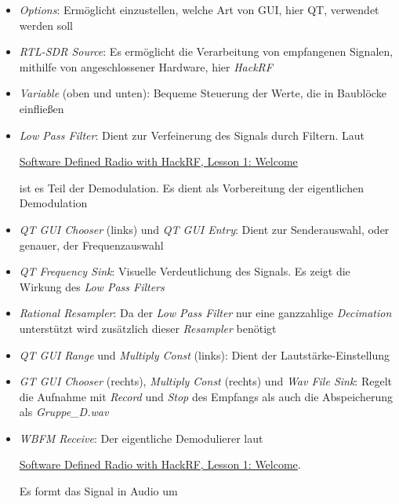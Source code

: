 \documentclass[12pt,a4paper]{article}
\begin{document}
\begin{itemize}
	\item \textit{Options}: Ermöglicht einzustellen, welche Art von 
	GUI, hier QT, verwendet werden soll
	\item \textit{RTL-SDR Source}: Es ermöglicht die Verarbeitung 
	von empfangenen Signalen, mithilfe von angeschlossener Hardware,
	hier \textit{HackRF}
	\item \textit{Variable} (oben und unten): Bequeme Steuerung der 
	Werte, die in Baublöcke einfließen 
	\item \textit{Low Pass Filter}: Dient zur Verfeinerung des 
	Signals durch Filtern. Laut 
	
	\href{https://youtu.be/TZmHgIPBLDo?t=1313}
	{Software Defined Radio with HackRF, Lesson 1: Welcome} 

	ist es Teil der Demodulation. Es dient als Vorbereitung der 
	eigentlichen Demodulation
	\item \textit{QT GUI Chooser} (links) und \textit{QT GUI Entry}:
	Dient zur Senderauswahl, oder genauer, der Frequenzauswahl
	\item \textit{QT Frequency Sink}: Visuelle Verdeutlichung des 
	Signals. Es zeigt die Wirkung des \textit{Low Pass Filters}
	\item \textit{Rational Resampler}: Da der \textit{Low Pass 
	Filter} nur eine ganzzahlige \textit{Decimation} unterstützt
	wird zusätzlich dieser \textit{Resampler} benötigt
	\item \textit{QT GUI Range} und \textit{Multiply Const} (links):
	Dient der Lautstärke-Einstellung
	\item \textit{GT GUI Chooser} (rechts), \textit{Multiply Const} 
	(rechts) und \textit{Wav File Sink}: Regelt die Aufnahme mit 
	\textit{Record} und \textit{Stop} des Empfangs als auch die 
	Abspeicherung als \textit{Gruppe\_D.wav} 
	\item \textit{WBFM Receive}: Der eigentliche Demodulierer laut
	 
	\href{https://youtu.be/TZmHgIPBLDo?t=1547}
	{Software Defined Radio with HackRF, Lesson 1: Welcome}.

	Es formt das Signal in Audio um	
\end{itemize}
\end{document}
